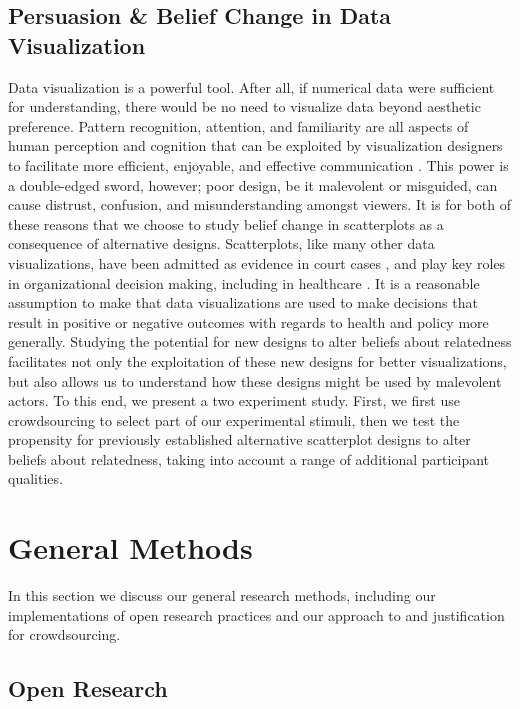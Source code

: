 \documentclass[manuscript,screen,review]{acmart}
\begin{document}
\subsection{Persuasion \& Belief Change in Data
Visualization}\label{sec-persuasion}

Data visualization is a powerful tool. After all, if numerical data were
sufficient for understanding, there would be no need to visualize data
beyond aesthetic preference. Pattern recognition, attention, and
familiarity are all aspects of human perception and cognition that can
be exploited by visualization designers to facilitate more efficient,
enjoyable, and effective communication \citep{franconeri_2021}. This
power is a double-edged sword, however; poor design, be it malevolent or
misguided, can cause distrust, confusion, and misunderstanding amongst
viewers. It is for both of these reasons that we choose to study belief
change in scatterplots as a consequence of alternative designs.
Scatterplots, like many other data visualizations, have been admitted as
evidence in court cases \citep{bobko_1979}, and play key roles in
organizational decision making, including in healthcare
\citep{poly_2019}. It is a reasonable assumption to make that data
visualizations are used to make decisions that result in positive or
negative outcomes with regards to health and policy more generally.
Studying the potential for new designs to alter beliefs about
relatedness facilitates not only the exploitation of these new designs
for better visualizations, but also allows us to understand how these
designs might be used by malevolent actors. To this end, we present a
two experiment study. First, we first use crowdsourcing to select part
of our experimental stimuli, then we test the propensity for previously
established alternative scatterplot designs to alter beliefs about
relatedness, taking into account a range of additional participant
qualities.

\section{General Methods}\label{sec-general-methods}

In this section we discuss our general research methods, including our
implementations of open research practices and our approach to and
justification for crowdsourcing.

\subsection{Open Research}\label{sec-open-research}
\end{document}
